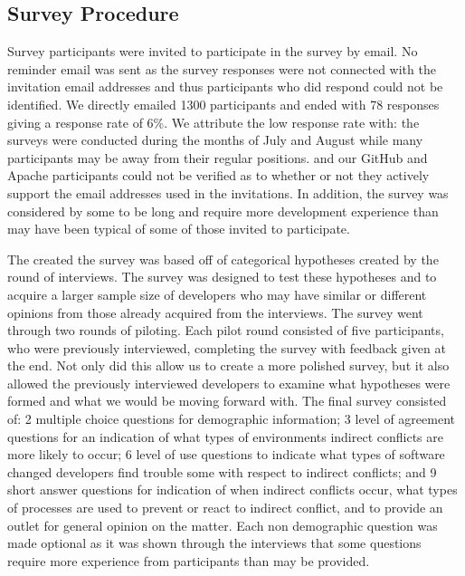 \documentclass[conference]{IEEEtran}
\begin{document}
\subsection{Survey Procedure}

Survey participants were invited to participate in the survey by email. No reminder email was sent as the
survey responses were not connected with the invitation email addresses and thus participants who did respond
could not be identified. We directly emailed 1300 participants and ended with 78 responses
giving a response rate of 6\%. We attribute the low response rate with: the surveys
were conducted during the months of July and August while many participants may be away from their regular positions.
and our GitHub and Apache participants could not be verified as to whether or not they actively support the
email addresses used in the invitations. In addition, the survey was considered by some to be long and require
more development experience than may have been typical of some of those invited to participate.

The created the survey was based off of categorical hypotheses created by the round of interviews. The survey
was designed to test these hypotheses and to acquire a larger sample size of developers who may have similar
or different opinions from those already acquired from the interviews. The survey went through two rounds of
piloting. Each pilot round consisted of five participants, who were previously interviewed, completing the survey
with feedback given at the end. Not only did this allow us to create a more polished survey, but it also allowed the previously interviewed developers to examine what hypotheses were
formed and what we would be moving forward with. The final survey consisted of:
2 multiple choice questions for demographic information; 3 level of agreement questions for an indication of
what types of environments indirect conflicts are more likely to occur;
6 level of use questions to indicate what types of software changed developers find trouble some with respect to
indirect conflicts; and 9 short answer questions for indication of when indirect conflicts occur, what types of
processes are used to prevent or react to indirect conflict, and to provide an outlet for general opinion
on the matter. Each non demographic question was made optional as it was shown 
through the interviews that some questions require more experience from participants than may be provided.

\end{document}
